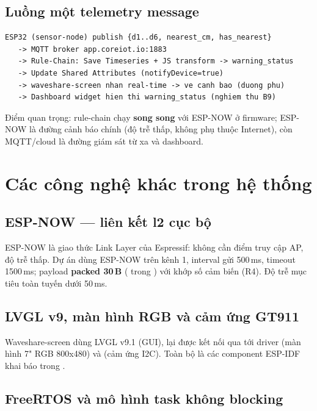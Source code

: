 \subsection{Luồng một telemetry message}

\begin{verbatim}
ESP32 (sensor-node) publish {d1..d6, nearest_cm, has_nearest}
   -> MQTT broker app.coreiot.io:1883
   -> Rule-Chain: Save Timeseries + JS transform -> warning_status
   -> Update Shared Attributes (notifyDevice=true)
   -> waveshare-screen nhan real-time -> ve canh bao (duong phu)
   -> Dashboard widget hien thi warning_status (nghiem thu B9)
\end{verbatim}

Điểm quan trọng: rule-chain chạy \textbf{song song} với ESP-NOW ở firmware;
ESP-NOW là đường cảnh báo chính (độ trễ thấp, không phụ thuộc Internet), còn
MQTT/cloud là đường giám sát từ xa và dashboard.

\section{Các công nghệ khác trong hệ thống}

\subsection{ESP-NOW — liên kết l2 cục bộ}

ESP-NOW là giao thức Link Layer của Espressif: không cần điểm truy cập AP,
độ trễ thấp. Dự án dùng ESP-NOW trên kênh 1, interval gửi 500\,ms, timeout
1500\,ms; payload \textbf{packed 30\,B} ( trong
) với  khớp số
cảm biến (R4). Độ trễ mục tiêu toàn tuyến dưới 50\,ms.

\subsection{LVGL v9, màn hình RGB và cảm ứng GT911}

Waveshare-screen dùng LVGL v9.1 (GUI), lại được kết nối qua
 tới driver  (màn hình 7"
RGB 800x480) và  (cảm ứng I2C). Toàn bộ là các
component ESP-IDF khai báo trong .

\subsection{FreeRTOS và mô hình task không blocking}

